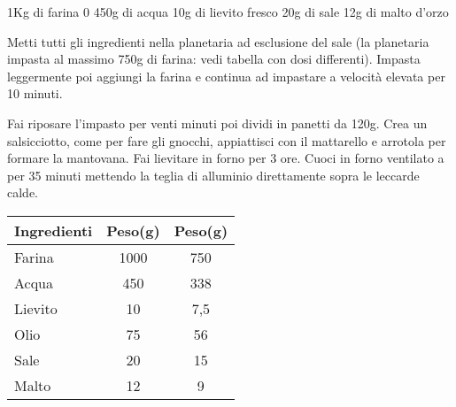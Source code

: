\begin{ingreds}
	1Kg di farina 0
	450g di acqua
	10g di lievito fresco
	20g di sale
	12g di malto d'orzo
	

\end{ingreds}

\begin{method}
Metti tutti gli ingredienti nella planetaria ad esclusione del sale (la planetaria impasta al massimo 750g di farina: vedi tabella con dosi differenti). Impasta leggermente poi aggiungi la farina e continua ad impastare a velocità elevata per 10 minuti.

Fai riposare l'impasto per venti minuti poi dividi in panetti da 120g. Crea un salsicciotto, come per fare gli gnocchi, appiattisci con il mattarello e arrotola per formare la mantovana. Fai lievitare in forno per 3 ore. Cuoci in forno ventilato a  per 35 minuti mettendo la teglia di alluminio direttamente sopra le leccarde calde.

\begin{table}[h]
\begin{tabular}{lcc}
\toprule
	Ingredienti	&	Peso(g)	&	Peso(g)\\
\midrule
	Farina		&	1000		&	750	\\
	Acqua		&	450		&	338	\\
	Lievito		&	10		&	7,5	\\
	Olio			&	75		&	56	\\
	Sale			&	20		&	15	\\
	Malto		&	12		&	9	\\
\bottomrule
\end{tabular}
\end{table}

\end{method}





